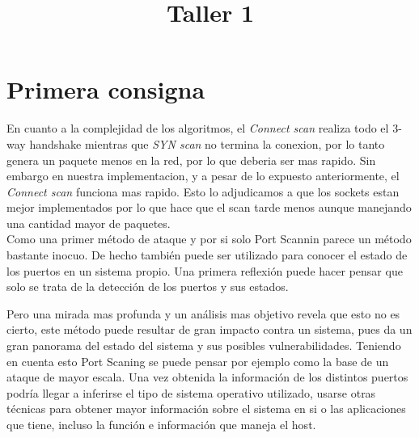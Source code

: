 \documentclass[a4paper]{article}
\title{Taller 1}
\begin{document}


\maketitle

\newpage




\newpage


\section{Primera consigna}


En cuanto a la complejidad de los algoritmos, el \textit{Connect scan} realiza todo el 3-way handshake mientras que \textit{SYN scan} no termina la conexion, por lo tanto genera un paquete menos en la red, por lo que deberia ser mas rapido. Sin embargo en nuestra implementacion, y a pesar de lo expuesto anteriormente, el \textit{Connect scan} funciona mas rapido. Esto lo adjudicamos a que los sockets estan mejor implementados por lo que hace que el scan tarde menos aunque manejando una cantidad mayor de paquetes.\\

Como una primer método de ataque y por si solo Port Scannin parece un método bastante inocuo. De hecho también puede ser utilizado para conocer el estado de los puertos en un sistema propio. Una primera
reflexión puede hacer pensar que solo se trata de la detección de los puertos y sus estados.

Pero una mirada mas profunda y un análisis mas objetivo revela que esto no es cierto, este método puede resultar de gran impacto contra un sistema, pues da un gran panorama del estado del sistema y sus
posibles vulnerabilidades. Teniendo en cuenta esto Port Scaning se puede pensar por ejemplo como la base de un ataque de mayor escala. Una vez obtenida la información de los distintos puertos podría llegar
a inferirse el tipo de sistema operativo utilizado, usarse otras técnicas para obtener mayor información sobre el sistema en si o las aplicaciones que tiene, incluso la función e información que maneja el
host.\\
\end{document}
